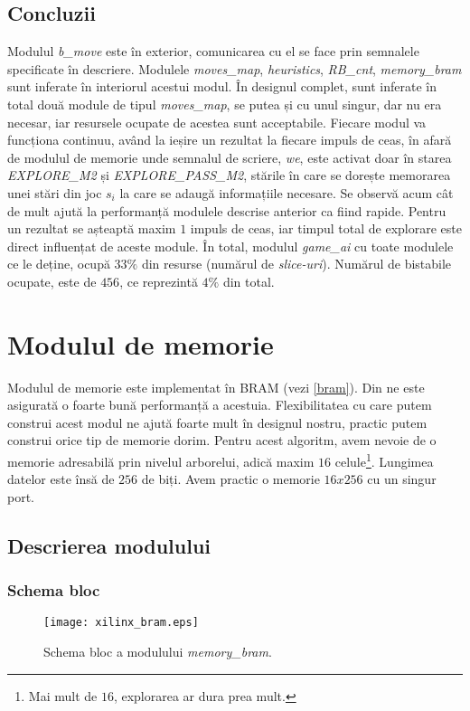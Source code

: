 \documentclass[12pt,twoside,a4paper,fleqn]{book}
\theoremstyle{definition}
\begin{document}
\subsection{Concluzii}
Modulul \emph{b\_move} este în exterior, comunicarea cu el se face prin semnalele specificate în descriere. Modulele \emph{moves\_map}, \emph{heuristics}, \emph{RB\_cnt}, \emph{memory\_bram} sunt inferate în interiorul acestui modul. În designul complet, sunt inferate în total două module de tipul \emph{moves\_map}, se putea și cu unul singur, dar nu era necesar, iar resursele ocupate de acestea sunt acceptabile. Fiecare modul va funcționa continuu, având la ieșire un rezultat la fiecare impuls de ceas, în afară de modulul de memorie unde semnalul de scriere, \emph{we}, este activat doar în starea \emph{EXPLORE\_M2} și \emph{EXPLORE\_PASS\_M2}, stările în care se dorește memorarea unei stări din joc $s_{i}$ la care se adaugă informațiile necesare. Se observă acum cât de mult ajută la performanță modulele descrise anterior ca fiind rapide. Pentru un rezultat se așteaptă maxim $1$ impuls de ceas, iar timpul total de explorare este direct influențat de aceste module. În total, modulul \emph{game\_ai} cu toate modulele ce le deține, ocupă $33\%$ din resurse (numărul de \emph{slice-uri}). Numărul de bistabile ocupate, este de $456$, ce reprezintă $4\%$ din total.

\section{Modulul de memorie}
\label{modul_memory_bram}
Modulul de memorie este implementat în BRAM (vezi \ref{bram}). Din \cite{xilinx_coding_practices} ne este asigurată o foarte bună performanță a acestuia. Flexibilitatea cu care putem construi acest modul ne ajută foarte mult în designul nostru, practic putem construi orice tip de memorie dorim. Pentru acest algoritm, avem nevoie de o memorie adresabilă prin nivelul arborelui, adică maxim $16$ celule\footnote{Mai mult de $16$, explorarea ar dura prea mult.}. Lungimea datelor este însă de $256$ de biți. Avem practic o memorie $16x256$ cu un singur port.
\subsection{Descrierea modulului} 
\subsubsection{Schema bloc}
\begin{figure}[h]
\texttt{[image: xilinx\_bram.eps]}
\caption{\small{Schema bloc a modulului \emph{memory\_bram}.}}
\label{fig:xilinx_bram}
\end{figure}
\end{document}
